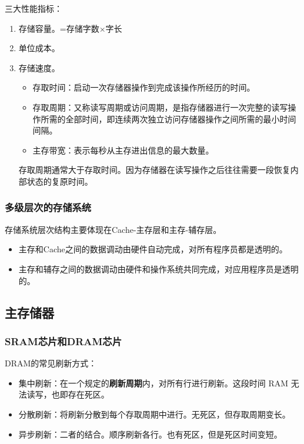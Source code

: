 \documentclass[12pt, a4paper, oneside]{ctexart}
\begin{document}
三大性能指标：
\begin{enumerate}
  \item 存储容量。=存储字数$\times$字长
  \item 单位成本。
  \item 存储速度。
  \begin{itemize}
    \item 存取时间：启动一次存储器操作到完成该操作所经历的时间。
    \item 存取周期：又称读写周期或访问周期，是指存储器进行一次完整的读写操作所需的全部时间，即连续两次独立访问存储器操作之间所需的最小时间间隔。
    \item 主存带宽：表示每秒从主存进出信息的最大数量。
  \end{itemize}
  存取周期通常大于存取时间。因为存储器在读写操作之后往往需要一段恢复内部状态的复原时间。
\end{enumerate}

\subsubsection{多级层次的存储系统}

存储系统层次结构主要体现在Cache-主存层和主存-辅存层。

\begin{itemize}
  \item 主存和Cache之间的数据调动由硬件自动完成，对所有程序员都是透明的。
  \item 主存和辅存之间的数据调动由硬件和操作系统共同完成，对应用程序员是透明的。
\end{itemize}

\subsection{主存储器}

\subsubsection{SRAM芯片和DRAM芯片}

DRAM的常见刷新方式：
\begin{itemize}
  \item 集中刷新：在一个规定的\textbf{刷新周期}内，对所有行进行刷新。这段时间 RAM 无法读写，也即存在死区。
  \item 分散刷新：将刷新分散到每个存取周期中进行。无死区，但存取周期变长。
  \item 异步刷新：二者的结合。顺序刷新各行。也有死区，但是死区时间变短。
\end{itemize}
\end{document}
